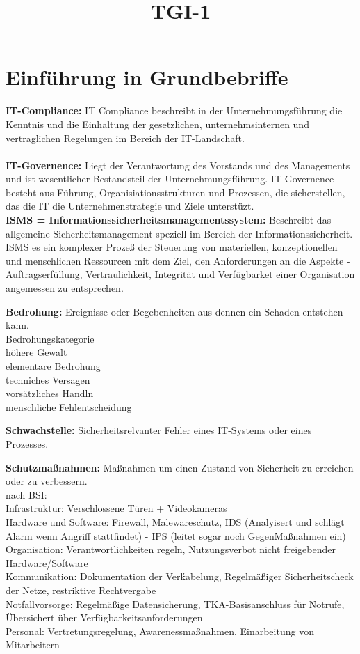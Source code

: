 \documentclass[a4paper,10pt]{scrartcl}
\title{TGI-1}
\author{}
\begin{document}
\section{Einführung in Grundbebriffe}

\textbf{IT-Compliance: }  IT Compliance beschreibt in der Unternehmungsführung die Kenntnis und die Einhaltung der gesetzlichen,
unternehmsinternen und vertraglichen Regelungen im Bereich der IT-Landschaft.
\\
\\
\textbf{IT-Governence: } Liegt der Verantwortung des Vorstands und des Managements und ist wesentlicher Bestandsteil der 
Unternehmungsführung. IT-Governence besteht aus Führung, Organisiationsstrukturen und Prozessen, die sicherstellen,
das die IT die Unternehmenstrategie und Ziele unterstüzt.
\\
\textbf{ISMS = Informationssicherheitsmanagementssystem: } Beschreibt das allgemeine Sicherheitsmanagement speziell im Bereich der
Informationssicherheit. ISMS es ein komplexer Prozeß der Steuerung von materiellen, konzeptionellen und menschlichen Ressourcen mit
dem Ziel, den Anforderungen an die Aspekte -Auftragserfüllung, Vertraulichkeit, Integrität und Verfügbarket einer Organisation
angemessen zu entsprechen.

\textbf{Bedrohung:}
Ereignisse oder Begebenheiten aus dennen ein Schaden entstehen kann.\\

Bedrohungskategorie\\
höhere Gewalt\\
elementare Bedrohung\\
techniches Versagen\\
vorsätzliches Handln\\
menschliche Fehlentscheidung

\textbf {Schwachstelle:} Sicherheitsrelvanter Fehler eines IT-Systems oder eines Prozesses.

\textbf{Schutzmaßnahmen: } Maßnahmen um einen Zustand von Sicherheit zu erreichen oder zu verbessern.
\\
nach BSI:\\
Infrastruktur: Verschlossene Türen + Videokameras\\
Hardware und Software: Firewall, Malewareschutz, IDS (Analyisert und schlägt Alarm wenn Angriff stattfindet) - IPS (leitet sogar noch
GegenMaßnahmen ein)\\
Organisation: Verantwortlichkeiten regeln, Nutzungsverbot nicht freigebender Hardware/Software\\
Kommunikation: Dokumentation der Verḱabelung, Regelmäßiger Sicherheitscheck der Netze, restriktive Rechtvergabe\\
Notfallvorsorge: Regelmäßige Datensicherung, TKA-Basisanschluss für Notrufe, Übersichert über Verfügbarkeitsanforderungen\\
Personal: Vertretungsregelung, Awarenessmaßnahmen, Einarbeitung von Mitarbeitern\\
\end{document}
